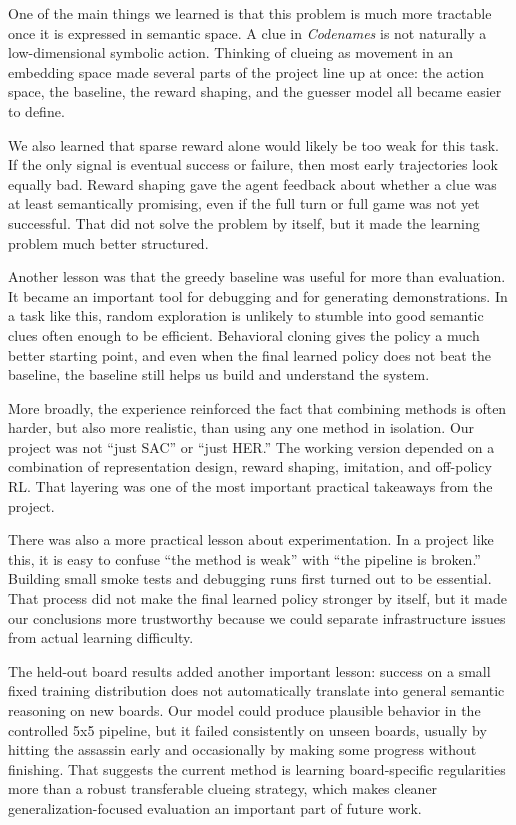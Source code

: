 \documentclass[9pt]{article}
\begin{document}
One of the main things we learned is that this problem is much more
tractable once it is expressed in semantic space. A clue in \emph{Codenames} is
not naturally a low-dimensional symbolic action. Thinking of clueing as
movement in an embedding space made several parts of the project line up
at once: the action space, the baseline, the reward shaping, and the
guesser model all became easier to define.

We also learned that sparse reward alone would likely be too weak for
this task. If the only signal is eventual success or failure, then most
early trajectories look equally bad. Reward shaping gave the agent
feedback about whether a clue was at least semantically promising, even
if the full turn or full game was not yet successful. That did not solve
the problem by itself, but it made the learning problem much better
structured.

Another lesson was that the greedy baseline was useful for more than
evaluation. It became an important tool for debugging and for generating
demonstrations. In a task like this, random exploration is unlikely to
stumble into good semantic clues often enough to be efficient.
Behavioral cloning gives the policy a much better starting point, and
even when the final learned policy does not beat the baseline, the
baseline still helps us build and understand the system.

More broadly, the experience reinforced the fact that combining
methods is often harder, but also more realistic, than using any one
method in isolation. Our project was not ``just SAC'' or ``just HER.''
The working version depended on a combination of representation design,
reward shaping, imitation, and off-policy RL. That layering was one of
the most important practical takeaways from the project.

There was also a more practical lesson about experimentation. In a
project like this, it is easy to confuse ``the method is weak'' with
``the pipeline is broken.'' Building small smoke tests and debugging
runs first turned out to be essential. That process did not make the
final learned policy stronger by itself, but it made our conclusions
more trustworthy because we could separate infrastructure issues from
actual learning difficulty.

The held-out board results added another important lesson: success on a
small fixed training distribution does not automatically translate into
general semantic reasoning on new boards. Our model could produce
plausible behavior in the controlled 5x5 pipeline, but it failed
consistently on unseen boards, usually by hitting the assassin early and
occasionally by making some progress without finishing. That suggests
the current method is learning board-specific regularities more than a
robust transferable clueing strategy, which makes cleaner
generalization-focused evaluation an important part of future work.
\end{document}
